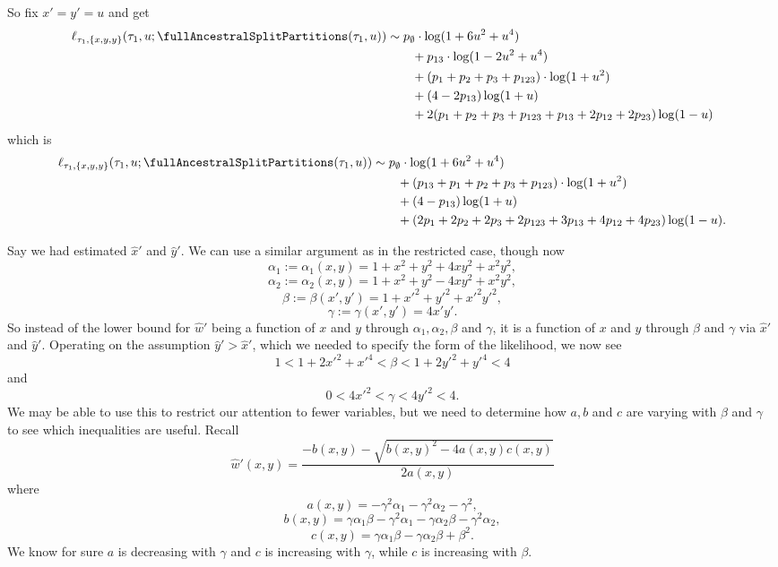 So fix $x'=y'=u$ and get
\begin{align*}
    \ell_{\tau_1,\{x,y,y\}}(\tau_1, u; \fullAncestralSplitPartitions(\tau_1,u))
    &\sim     p_{\emptyset}  \cdot\log(1+6u^2+u^4) \\
    &\qquad + p_{13}         \cdot\log(1-2u^2+u^4) \\
    &\qquad + (p_{1} + p_{2} + p_{3} + p_{123})          \cdot\log(1+u^2) \\
    &\qquad + (4-2p_{13})\log(1+u) \\
    &\qquad + 2(p_{1}+p_{2}+p_{3}+p_{123}+p_{13}+2p_{12}+2p_{23})\log(1-u) \\
\end{align*}
which is
\begin{align*}
    \ell_{\tau_1,\{x,y,y\}}(\tau_1, u; \fullAncestralSplitPartitions(\tau_1,u))
    &\sim     p_{\emptyset}  \cdot\log(1+6u^2+u^4) \\
    &\qquad + (p_{13} + p_{1} + p_{2} + p_{3} + p_{123})          \cdot\log(1+u^2) \\
    &\qquad + (4-p_{13})\log(1+u) \\
    &\qquad + (2p_{1}+2p_{2}+2p_{3}+2p_{123}+3p_{13}+4p_{12}+4p_{23})\log(1-u). \\
\end{align*}

Say we had estimated $\hat{x}'$ and $\hat{y}'$.
We can use a similar argument as in the restricted case, though now
$$
\alpha_1 := \alpha_1(x, y) = 1+x^2+y^2+4xy^2+x^2y^2,
$$
$$
\alpha_2 := \alpha_2(x, y) = 1+x^2+y^2-4xy^2+x^2y^2,
$$
$$
\beta := \beta(x', y') = 1+x'^2+y'^2+x'^2y'^2,
$$
$$
\gamma := \gamma(x', y') = 4x'y'.
$$
So instead of the lower bound for $\hat{w}'$ being a function of $x$ and $y$ through $\alpha_1,\alpha_2,\beta$ and $\gamma$, it is a function of $x$ and $y$ through $\beta$ and $\gamma$ via $\hat{x}'$ and $\hat{y}'$.
Operating on the assumption $\hat{y}' > \hat{x}'$, which we needed to specify the form of the likelihood, we now see
$$
1 < 1 + 2x'^2 + x'^4 < \beta < 1+2y'^2+y'^4 < 4
$$
and
$$
0 < 4x'^2 < \gamma < 4y'^2 < 4.
$$
We may be able to use this to restrict our attention to fewer variables, but we need to determine how $a,b$ and $c$ are varying with $\beta$ and $\gamma$ to see which inequalities are useful.
Recall
$$
\hat{w}'(x, y) = \frac{-b(x, y) - \sqrt{b(x, y)^2 - 4a(x, y)c(x, y)}}{2a(x, y)}
$$
where
$$
a(x, y) = -\gamma^2 \alpha_1 - \gamma^2 \alpha_2 - \gamma^2,
$$
$$
b(x, y) = \gamma \alpha_1 \beta - \gamma^2\alpha_1 - \gamma \alpha_2 \beta - \gamma^2 \alpha_2,
$$
$$
c(x, y) = \gamma \alpha_1 \beta - \gamma \alpha_2 \beta + \beta^2.
$$
We know for sure $a$ is decreasing with $\gamma$ and $c$ is increasing with $\gamma$, while $c$ is increasing with $\beta$.

